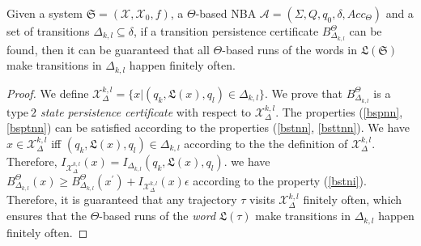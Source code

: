 \documentclass[acmlarge]{acmart}
\begin{document}
\begin{theorem}
  \label{transition-persistence-lemma1}
  Given a system $\mathfrak{S}=(\mathcal{X}, \mathcal{X}_0, f)$, a $\Theta$-based NBA $\mathcal{A} = (\Sigma, Q, q_0, \delta, Acc_{\Theta})$ and a set of transitions $\Delta_{k, l} \subseteq \delta$, if a transition persistence certificate \(B^{\Theta}_{\Delta_{k, l}}\) can be found, then it can be guaranteed that all $\Theta$-based runs of the words in $\mathfrak{L}(\mathfrak{S})$ make transitions in $\Delta_{k,l}$ happen finitely often.
\end{theorem}

\begin{proof}
We define \(\mathcal{X}_{\Delta}^{k, l}=\{x | (q_k, \mathfrak{L}(x), q_l) \in \Delta_{k,l}\} \). We prove that \(B^{\Theta}_{\Delta_{k, l}}\) is a \emph{$\mathrm{type~2}$ state persistence certificate} with respect to \(\mathcal{X}_{\Delta}^{k, l}\). The properties (\ref{bspnn}, \ref{bsptnn}) can be satisfied according to the properties (\ref{bstnn}, \ref{bsttnn}). 
We have \(x \in \mathcal{X}_{\Delta}^{k, l}\)  iff  \((q_k, \mathfrak{L}(x), q_l) \in \Delta_{k, l}\) according to the the definition of $\mathcal{X}_{\Delta}^{k, l}$. Therefore, \(I_{\mathcal{X}_{\Delta}^{k, l}}(x) = I_{\Delta_{k,l}}(q_k, \mathfrak{L}(x), q_l)\). we have \(B^{\Theta}_{\Delta_{k, l}}(x) \geq B^{\Theta}_{\Delta_{k, l}}(x^{\prime}) + I_{\mathcal{X}_{\Delta}^{k, l}}(x)\epsilon\) according to the property (\ref{bstni}).
Therefore, it is guaranteed that any trajectory \(\tau\) visits \(\mathcal{X}_{\Delta}^{k, l}\) finitely often, which ensures that the $\Theta$-based runs of the \emph{word} \(\mathfrak{L}(\tau)\) make transitions in \(\Delta_{k, l}\) happen finitely often.
\end{proof}
\end{document}

